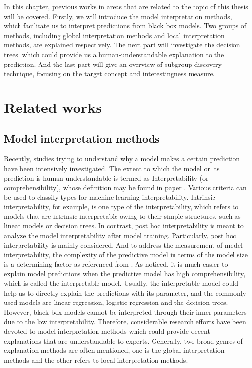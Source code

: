 In this chapter, previous works in areas that are related to the topic of this thesis will be covered. Firstly, we will introduce the model interpretation methods, which facilitate us to interpret predictions from black box models. Two groups of methods, including global interpretation methods and local interpretation methods, are explained respectively. The next part will investigate the decision trees, which could provide us a human-understandable explanation to the prediction. And the last part will give an overview of subgroup discovery technique, focusing on the target concept and interestingness measure. 

\section{Related works}

\subsection{Model interpretation methods}

Recently, studies trying to understand why a model makes a certain prediction have been intensively investigated. The extent to which the model or its prediction is human-understandable is termed as Interpretability (or comprehensibility), whose definition may be found in paper \cite{kim2016examples}. Various criteria can be used to classify types for machine learning interpretability. Intrinsic interpretability, for example, is one type of the interpretability, which refers to models that are intrinsic interpretable owing to their simple structures, such as linear models or decision trees. In contrast, post hoc interpretability is meant to analyze the model interpretability after model training. Particularly, post hoc interpretability is mainly considered. And to address the measurement of model interpretability, the complexity of the predictive model in terms of the model size is a determining factor as referenced from \cite{freitas2014comprehensible}. As noticed, it is much easier to explain model predictions when the predictive model has high comprehensibility, which is called the interpretable model. Usually, the interpretable model could help us to directly explain the predictions with its parameter, and the commonly used models are linear regression, logistic regression and the decision trees. However, black box models cannot be interpreted through their inner parameters due to the low interpretability. Therefore, considerable research efforts have been devoted to model interpretation methods which could provide decent explanations that are understandable to experts. Generally, two broad genres of explanation methods are often mentioned, one is the global interpretation methods and the other refers to local interpretation methods.


